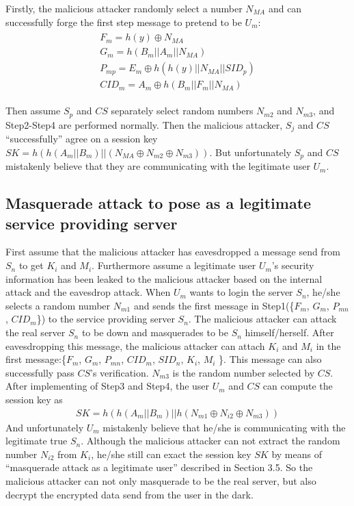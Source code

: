 \documentclass[preprint,12pt]{elsarticle}
\begin{document}
Firstly, the malicious attacker randomly select a number $N_{MA}$ and can successfully forge the first step message to pretend to be $U_m$:
\begin{eqnarray}
\left.\begin{array}{l}
F_m=h(y)\oplus N_{MA}\\
G_m=h(B_m||A_m||N_{MA})\\
P_{mp}=E_m\oplus h(h(y)||N_{MA}||SID_p)\\
CID_m=A_m\oplus h(B_m||F_m||N_{MA})
 \end{array} \right.
\end{eqnarray}

Then assume $S_p$ and $CS$ separately select random numbers $N_{m2}$ and $N_{m3}$, and Step2-Step4 are performed normally. Then the malicious attacker, $S_j$ and $CS$ ``successfully'' agree on a session key $SK=h(h(A_m||B_m)||(N_{MA}\oplus N_{m2}\oplus N_{m3}))$. But unfortunately $S_p$ and $CS$ mistakenly believe that they are communicating with the legitimate user $U_m$.

\subsection{Masquerade attack to pose as a legitimate service providing server}
First assume that the malicious attacker has eavesdropped a message send from $S_n$ to get $K_i$ and $M_i$. Furthermore assume a legitimate user $U_m$'s security information has been leaked to the malicious attacker based on the internal attack and the eavesdrop attack. When $U_m$ wants to login the server $S_n$, he/she selects a random number $N_{m1}$ and sends the first message in Step1(\{$F_m$, $G_m$, $P_{mn}$, $CID_m$\}) to the service providing server $S_n$. The malicious attacker can attack the real server $S_n$ to be down and masquerades to be $S_n$ himself/herself. After eavesdropping this message, the malicious attacker can attach $K_i$ and $M_i$ in the first message:\{$F_m$, $G_m$, $P_{mn}$, $CID_m$, $SID_n$, $K_i$, $M_i$ \}. This message can also successfully pass $CS$'s verification. $N_{m3}$ is the random number selected by $CS$. After implementing of Step3 and Step4, the user $U_m$ and $CS$ can compute the session key as
\begin{eqnarray}
SK=h(h(A_m||B_m)||h(N_{m1}\oplus N_{i2}\oplus N_{m3}))
\end{eqnarray}
And unfortunately $U_m$ mistakenly believe that he/she is communicating with the legitimate true $S_n$. Although the malicious attacker can not extract the random number $N_{i2}$ from $K_i$, he/she still can exact the session key $SK$ by means of ``masquerade attack as a legitimate user'' described in Section 3.5. So the malicious attacker can not only masquerade to be the real server, but also decrypt the encrypted data send from the user in the dark.
\end{document}

